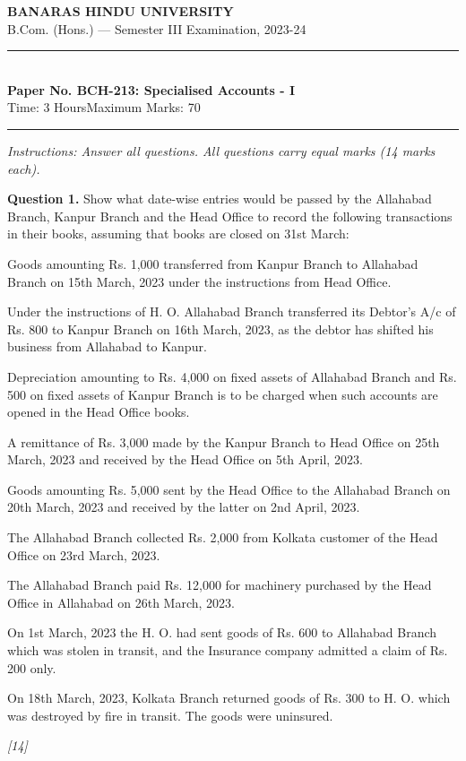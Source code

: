 \documentclass[11pt,a4paper]{article}
\newcommand{\pts}[1]{\hfill   \textit{[#1]}}
\begin{document}
\begin{center}
  {\large\bfseries BANARAS HINDU UNIVERSITY}\\[2pt]
  {\normalsize B.Com. (Hons.) --- Semester III Examination, 2023-24}\\[6pt]
  \rule{0.8\linewidth}{0.5pt}\\[6pt]
  {\large\bfseries Paper No. BCH-213: Specialised Accounts - I}\\[4pt]
  {\normalsize Time: 3 Hours\hfill Maximum Marks: 70}
\end{center}

\rule{\linewidth}{0.4pt}

\smallskip



\noindent   \textit{Instructions: Answer all questions. All questions carry equal marks (14 marks each).}

\bigskip




\noindent   \textbf{Question 1.}
Show what date-wise entries would be passed by the Allahabad Branch, Kanpur Branch and the Head Office to record the following transactions in their books, assuming that books are closed on 31st March:

\begin{parts}
  \item Goods amounting Rs. 1,000 transferred from Kanpur Branch to Allahabad Branch on 15th March, 2023 under the instructions from Head Office.
  \item Under the instructions of H. O. Allahabad Branch transferred its Debtor's A/c of Rs. 800 to Kanpur Branch on 16th March, 2023, as the debtor has shifted his business from Allahabad to Kanpur.
  \item Depreciation amounting to Rs. 4,000 on fixed assets of Allahabad Branch and Rs. 500 on fixed assets of Kanpur Branch is to be charged when such accounts are opened in the Head Office books.
  \item A remittance of Rs. 3,000 made by the Kanpur Branch to Head Office on 25th March, 2023 and received by the Head Office on 5th April, 2023.
  \item Goods amounting Rs. 5,000 sent by the Head Office to the Allahabad Branch on 20th March, 2023 and received by the latter on 2nd April, 2023.
  \item The Allahabad Branch collected Rs. 2,000 from Kolkata customer of the Head Office on 23rd March, 2023.
  \item The Allahabad Branch paid Rs. 12,000 for machinery purchased by the Head Office in Allahabad on 26th March, 2023.
  \item On 1st March, 2023 the H. O. had sent goods of Rs. 600 to Allahabad Branch which was stolen in transit, and the Insurance company admitted a claim of Rs. 200 only.
  \item On 18th March, 2023, Kolkata Branch returned goods of Rs. 300 to H. O. which was destroyed by fire in transit. The goods were uninsured.
\end{parts}\pts{14}
\end{document}

